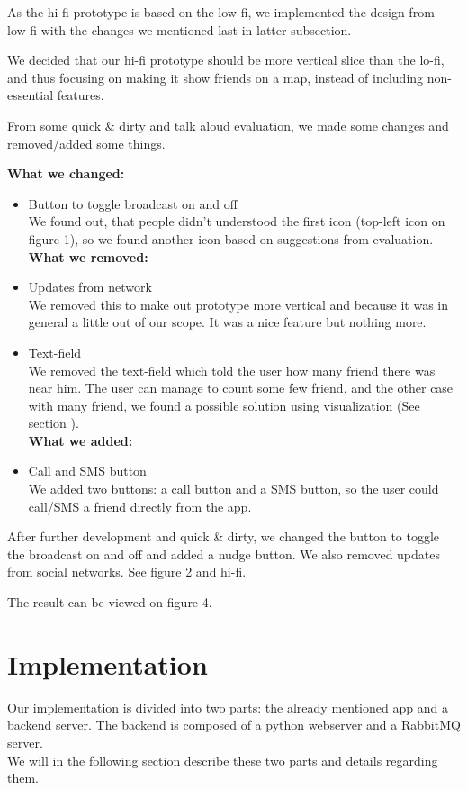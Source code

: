 \documentclass[runningheads,a4paper]{llncs}
\begin{document}
As the hi-fi prototype is based on the low-fi, we implemented the design from low-fi with the changes we mentioned last in latter subsection. 

We decided that our hi-fi prototype should be more vertical slice than the lo-fi, and thus focusing on making it show friends on a map, instead of including non-essential features. 

From some quick \& dirty and talk aloud evaluation, we made some changes and removed/added some things. 

\textbf{What we changed:}\begin{itemize}
\item Button to toggle broadcast on and off\\
We found out, that people didn’t understood the first icon (top-left icon on figure 1), so we found another icon based on suggestions from evaluation. \\


\textbf{What we removed:}
\item Updates from network\\
We removed this to make out prototype more vertical and because it was in general a little out of our scope. It was a nice feature but nothing more. \\

\item Text-field\\
We removed the text-field which told the user how many friend there was near him. The user can manage to count some few friend, and the other case with many friend, we found a possible solution using visualization (See section ). \\

\textbf{What we added:}
\item Call and SMS button \\
We added two buttons: a call button and a SMS button, so the user could call/SMS a friend directly from the app. 

\end{itemize}

After further development and quick \& dirty, we changed the button to toggle the broadcast on and off and added a nudge button. We also removed updates from social networks. See figure 2 and hi-fi. 

The result can be viewed on figure 4. 

\section{Implementation}
Our implementation is divided into two parts: the already mentioned app and a backend server. The backend is composed of a python webserver and a RabbitMQ server\cite{rabbitmq}. \\
We will in the following section describe these two parts and details regarding them. 
\end{document}
